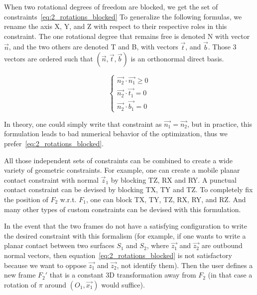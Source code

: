 \begin{itemize}
When two rotational degrees of freedom are blocked, we get the set of constraints~\ref{eq:2_rotations_blocked}
To generalize the following formulas, we rename the axis X, Y, and Z with respect to their respective roles in this constraint.
The one rotational degree that remains free is denoted N with vector $\vec{n}$, and the two others are denoted T and B, with vectors $\vec{t}$, and $\vec{b}$.
Those 3 vectors are ordered such that $(\vec{n}, \vec{t}, \vec{b})$ is an orthonormal direct basis.

\begin{equation}
\label{eq:2_rotations_blocked}
\begin{cases}
  \vec{n_2}\cdot\vec{n_1} \geq 0 \\
  \vec{n_2}\cdot\vec{t_1} = 0 \\
  \vec{n_2}\cdot\vec{b_1} = 0
\end{cases}
\end{equation}

In theory, one could simply write that constraint as $\vec{n_1}=\vec{n_2}$, but in practice, this formulation leads to bad numerical behavior of the optimization, thus we prefer~\ref{eq:2_rotations_blocked}.

All those independent sets of constraints can be combined to create a wide variety of geometric constraints.
For example, one can create a mobile planar contact constraint with normal $\vec{z}_1$ by blocking TZ, RX and RY.
A punctual contact constraint can be devised by blocking TX, TY and TZ.
To completely fix the position of $F_2$ w.r.t. $F_1$, one can block TX, TY, TZ, RX, RY, and RZ.
And many other types of custom constraints can be devised with this formulation.

In the event that the two frames do not have a satisfying configuration to write the desired constraint with this formalism (for example, if one wants to write a planar contact between two surfaces $S_1$ and $S_2$, where $\vec{z_1}$ and $\vec{z_2}$ are outbound normal vectors, then equation~\ref{eq:2_rotations_blocked} is not satisfactory because we want to oppose $\vec{z_1}$ and $\vec{z_2}$, not identify them).
Then the user defines a new frame $F_2'$ that is a constant 3D transformation away from $F_2$ (in that case a rotation of $\pi$ around $(O_1,\vec{x_1})$ would suffice).


\end{itemize}
